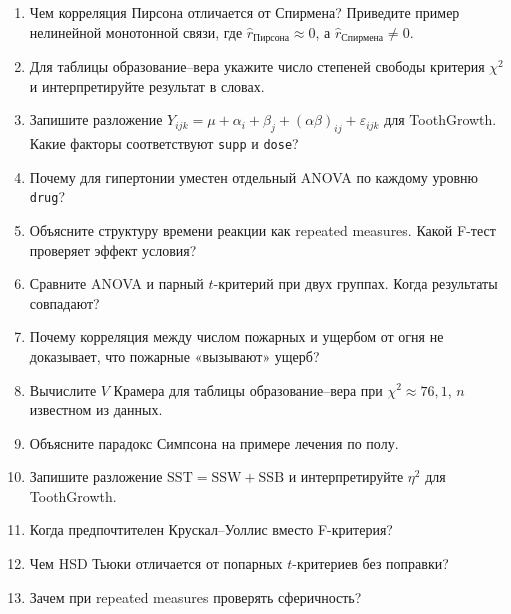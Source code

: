 \begin{enumerate}
    \item Чем корреляция Пирсона отличается от Спирмена?
          Приведите пример нелинейной монотонной связи, где $\hat r_{\text{Пирсона}}\approx 0$, а $\hat r_{\text{Спирмена}}\neq 0$.
    \item Для таблицы образование--вера укажите число степеней свободы
          критерия $\chi^2$ и интерпретируйте результат в словах.
    \item Запишите разложение $Y_{ijk}=\mu+\alpha_i+\beta_j+(\alpha\beta)_{ij}+\varepsilon_{ijk}$
          для ToothGrowth. Какие факторы соответствуют \texttt{supp} и \texttt{dose}?
    \item Почему для гипертонии уместен отдельный ANOVA
          по каждому уровню \texttt{drug}?
    \item Объясните структуру времени реакции как repeated measures.
          Какой F-тест проверяет эффект условия?
    \item Сравните ANOVA и парный $t$-критерий при двух группах.
          Когда результаты совпадают?
    \item Почему корреляция между числом пожарных и ущербом от огня
          не доказывает, что пожарные «вызывают» ущерб?
    \item Вычислите $V$ Крамера для таблицы образование--вера
          при $\chi^2\approx 76{,}1$, $n$ известном из данных.
    \item Объясните парадокс Симпсона на примере лечения по полу.
    \item Запишите разложение $\mathrm{SST}=\mathrm{SSW}+\mathrm{SSB}$
          и интерпретируйте $\eta^2$ для ToothGrowth.
    \item Когда предпочтителен Крускал--Уоллис вместо F-критерия?
    \item Чем HSD Тьюки отличается от попарных $t$-критериев без поправки?
    \item Зачем при repeated measures проверять сферичность?
\end{enumerate}
